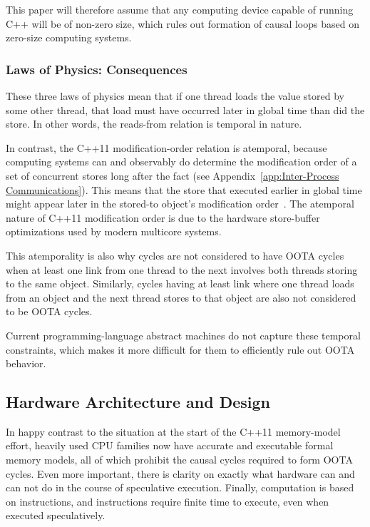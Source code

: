 \documentclass[10]{article}
\begin{document}
This paper will therefore assume that any computing device capable of
running C++ will be of non-zero size, which rules out formation of
causal loops based on zero-size computing systems.

\subsubsection{Laws of Physics: Consequences}
\label{sec:Laws of Physics: Consequences}

These three laws of physics mean that if one thread loads the value
stored by some other thread, that load must have occurred later
in global time than did the store.
In other words, the reads-from relation is temporal in nature.

In contrast, the C++11 modification-order relation is atemporal,
because computing systems can and observably do determine the
modification order of a set of concurrent stores long after the fact
(see Appendix~\ref{app:Inter-Process Communications}).
This means that the store that executed earlier in global time
might appear later in the stored-to object's modification
order~\cite{McKenney20xxParallelProgramming}.
The atemporal nature of C++11 modification order is due to the hardware
store-buffer optimizations used by modern multicore systems.

This atemporality is also why cycles are not considered to have
OOTA cycles when at least one link from one thread to the next
involves both threads storing to the same object.
Similarly, cycles having at least link where one thread loads from an
object and the next thread stores to that object are also not considered
to be OOTA cycles.

Current programming-language abstract machines do not capture these
temporal constraints, which makes it more difficult for them to
efficiently rule out OOTA behavior.

\subsection{Hardware Architecture and Design}
\label{sec:Hardware Architecture and Design}

In happy contrast to the situation at the start of the C++11 memory-model
effort, heavily used CPU families now have accurate and executable formal
memory models, all of which prohibit the causal cycles required to form
OOTA cycles.
Even more important, there is clarity on exactly what hardware can and
can not do in the course of speculative execution.
Finally, computation is based on instructions, and instructions require
finite time to execute, even when executed speculatively.
\end{document}
